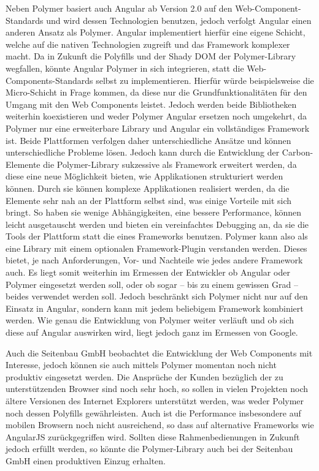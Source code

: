 Neben Polymer basiert auch Angular ab Version 2.0 auf den Web-Component-Stan\-dards und wird dessen Technologien benutzen, jedoch verfolgt Angular einen anderen Ansatz als Polymer. Angular implementiert hierfür eine eigene Schicht, welche auf die nativen Technologien zugreift und das Framework komplexer macht. Da in Zukunft die Polyfills und der Shady \ac{DOM} der Polymer-Library wegfallen, könnte Angular Polymer in sich integrieren, statt die Web-Components-Standards selbst zu implementieren. Hierfür würde beispielsweise die Micro-Schicht in Frage kommen, da diese nur die Grundfunktionalitäten für den Umgang mit den Web Components leistet. Jedoch werden beide Bibliotheken weiterhin koexistieren und weder Polymer Angular ersetzen noch umgekehrt, da Polymer nur eine erweiterbare Library und Angular ein vollständiges Framework ist. Beide Plattformen verfolgen daher unterschiedliche Ansätze und können unterschiedliche Probleme lösen. Jedoch kann durch die Entwicklung der Carbon-Elemente die Polymer-Library sukzessive als Framework erweitert werden, da diese eine neue Möglichkeit bieten, wie Applikationen strukturiert werden können. Durch sie können komplexe Applikationen realisiert werden, da die Elemente sehr nah an der Plattform selbst sind, was einige Vorteile mit sich bringt. So haben sie wenige Abhängigkeiten, eine bessere Performance, können leicht ausgetauscht werden und bieten ein vereinfachtes Debugging an, da sie die Tools der Plattform statt die eines Frameworks benutzen. Polymer kann also als eine Library mit einem optionalen Framework-Plugin verstanden werden. Dieses bietet, je nach Anforderungen, Vor- und Nachteile wie jedes andere Framework auch. Es liegt somit weiterhin im Ermessen der Entwickler ob Angular oder Polymer eingesetzt werden soll, oder ob sogar -- bis zu einem gewissen Grad -- beides verwendet werden soll. Jedoch beschränkt sich Polymer nicht nur auf den Einsatz in Angular, sondern kann mit jedem beliebigem Framework kombiniert werden. Wie genau die Entwicklung von Polymer weiter verläuft und ob sich diese auf Angular auswirken wird, liegt jedoch ganz im Ermessen von Google.

Auch die Seitenbau GmbH beobachtet die Entwicklung der Web Components mit Interesse, jedoch können sie auch mittels Polymer momentan noch nicht produktiv eingesetzt werden. Die Ansprüche der Kunden bezüglich der zu unterstützenden Browser sind noch sehr hoch, so sollen in vielen Projekten noch ältere Versionen des Internet Explorers unterstützt werden, was weder Polymer noch dessen Polyfills gewährleisten. Auch ist die Performance insbesondere auf mobilen Browsern noch nicht ausreichend, so dass auf alternative Frameworks wie AngularJS zurückgegriffen wird. Sollten diese Rahmenbedienungen in Zukunft jedoch erfüllt werden, so könnte die Polymer-Library auch bei der Seitenbau GmbH einen produktiven Einzug erhalten.

